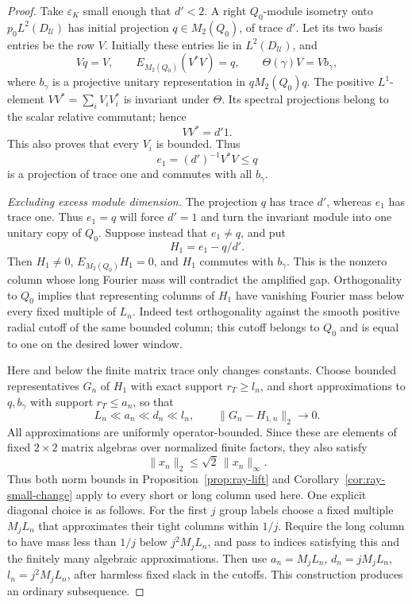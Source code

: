 \begin{proof}
Take \(\varepsilon_K\) small enough that \(d'<2\).
A right \(Q_0\)-module isometry onto \(p_0L^2(D_\mathcal U)\)
has initial projection \(q\in M_2(Q_0)\), of trace \(d'\).
Let its two basis entries be the row \(V\).
Initially these entries lie in \(L^2(D_\mathcal U)\), and
\begin{equation}
 Vq=V,\qquad E_{M_2(Q_0)}(V^*V)=q,\qquad
 \Theta(\gamma)V=Vb_\gamma ,
 \label{eq:scale-module-basis}
\end{equation}
where \(b_\gamma\) is a projective unitary representation
in \(qM_2(Q_0)q\).
The positive \(L^1\)-element \(VV^*=\sum_iV_iV_i^*\)
is invariant under \(\Theta\).  Its spectral projections
belong to the scalar relative commutant; hence
\begin{equation}
 VV^*=d'1.
 \label{eq:scale-bounded-basis}
\end{equation}
This also proves that every \(V_i\) is bounded.  Thus
\begin{equation}
 e_1=(d')^{-1}V^*V\le q
 \label{eq:scale-excess-projection}
\end{equation}
is a projection of trace one and commutes with all \(b_\gamma\).

\emph{Excluding excess module dimension.}
The projection $q$ has trace $d'$, whereas $e_1$ has trace one.
Thus $e_1=q$ will force $d'=1$ and turn the invariant module into
one unitary copy of $Q_0$. Suppose instead that $e_1\ne q$, and put
\[
 H_1=e_1-q/d'.
\]
Then $H_1\ne0$, $E_{M_2(Q_0)}H_1=0$, and $H_1$ commutes with
$b_\gamma$. This is the nonzero column whose long Fourier mass will
contradict the amplified gap.  Orthogonality to \(Q_0\) implies
that representing columns of \(H_1\) have vanishing Fourier
mass below every fixed multiple of \(L_n\).  Indeed test
orthogonality against the smooth positive radial cutoff
of the same bounded column; this cutoff belongs to \(Q_0\)
and is equal to one on the desired lower window.

Here and below the finite matrix trace only changes constants.
Choose bounded representatives \(G_n\) of \(H_1\) with exact
support \(r_T\ge l_n\), and short approximations to \(q,b_\gamma\)
with support \(r_T\le a_n\), so that
\begin{equation}
 L_n\ll a_n\ll d_n\ll l_n,\qquad
 \|G_n-H_{1,n}\|_2\longrightarrow0.
 \label{eq:scale-separated-scales}
\end{equation}
All approximations are uniformly operator-bounded.  Since these
are elements of fixed $2\times2$ matrix algebras over normalized
finite factors, they also satisfy
\[
 \|x_n\|_2\le\sqrt2\,\|x_n\|_\infty.
\]
Thus both norm bounds in Proposition~\ref{prop:ray-lift} and
Corollary~\ref{cor:ray-small-change} apply to every short or long
column used here.  One
explicit diagonal choice is as follows.  For the first \(j\)
group labels choose a fixed multiple \(M_jL_n\) that
approximates their tight columns within \(1/j\).  Require
the long column to have mass less than \(1/j\) below
\(j^2M_jL_n\), and pass to indices satisfying this and the
finitely many algebraic approximations.  Then use
\(a_n=M_jL_n\), \(d_n=jM_jL_n\),
\(l_n=j^2M_jL_n\), after harmless fixed slack in the cutoffs.
This construction produces an ordinary subsequence.


\end{proof}
